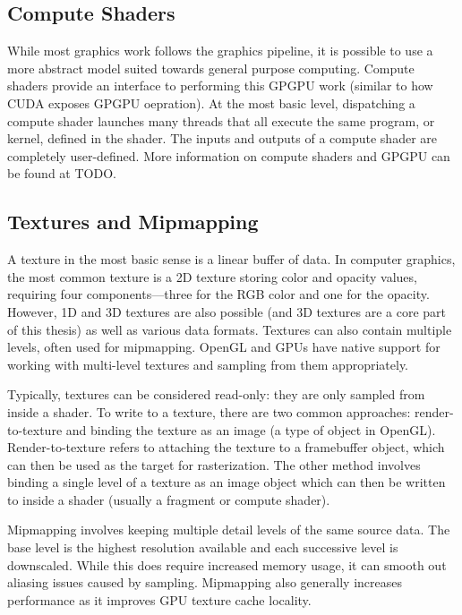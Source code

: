 \subsection{Compute Shaders}
While most graphics work follows the graphics pipeline, it is possible to use a more abstract model suited towards general purpose computing. Compute shaders provide an interface to performing this GPGPU work (similar to how CUDA exposes GPGPU oepration). At the most basic level, dispatching a compute shader launches many threads that all execute the same program, or kernel, defined in the shader. The inputs and outputs of a compute shader are completely user-defined. More information on compute shaders and GPGPU can be found at TODO.

\subsection{Textures and Mipmapping}
A texture in the most basic sense is a linear buffer of data. In computer graphics, the most common texture is a 2D texture storing color and opacity values, requiring four components---three for the RGB color and one for the opacity. However, 1D and 3D textures are also possible (and 3D textures are a core part of this thesis) as well as various data formats. Textures can also contain multiple levels, often used for mipmapping. OpenGL and GPUs have native support for working with multi-level textures and sampling from them appropriately.

Typically, textures can be considered read-only: they are only sampled from inside a shader. To write to a texture, there are two common approaches: render-to-texture and binding the texture as an image (a type of object in OpenGL). Render-to-texture refers to attaching the texture to a framebuffer object, which can then be used as the target for rasterization. The other method involves binding a single level of a texture as an image object which can then be written to inside a shader (usually a fragment or compute shader).

Mipmapping involves keeping multiple detail levels of the same source data. The base level is the highest resolution available and each successive level is downscaled. While this does require increased memory usage, it can smooth out aliasing issues caused by sampling. Mipmapping also generally increases performance as it improves GPU texture cache locality.


